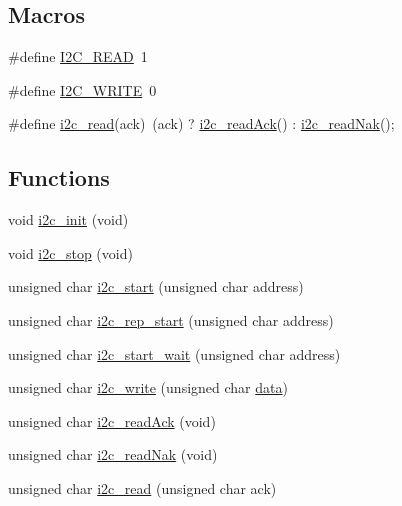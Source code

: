  \subsection*{Macros}
\begin{DoxyCompactItemize}
\item 
\#define \hyperlink{group__pfleury__ic2master_gab5c0fbe837494c5f9130a5914854250d}{I2\-C\-\_\-\-R\-E\-A\-D}~1
\item 
\#define \hyperlink{group__pfleury__ic2master_ga9536bf85bced4f4e549a82fb18eb6140}{I2\-C\-\_\-\-W\-R\-I\-T\-E}~0
\item 
\#define \hyperlink{group__pfleury__ic2master_gad33503cf741851d1bca1d274e9001796}{i2c\-\_\-read}(ack)~(ack) ? \hyperlink{group__pfleury__ic2master_ga32ac22052d55f93375b024192217db21}{i2c\-\_\-read\-Ack}() \-: \hyperlink{group__pfleury__ic2master_gad89e839fc17b05fbb5dd79897c55234e}{i2c\-\_\-read\-Nak}();
\end{DoxyCompactItemize}
\subsection*{Functions}
\begin{DoxyCompactItemize}
\item 
void \hyperlink{group__pfleury__ic2master_ga5730d9445429351b9f750084c5cb5aae}{i2c\-\_\-init} (void)
\item 
void \hyperlink{group__pfleury__ic2master_gad35d4e4f52ca74b503d5e5e1e0a3f5f3}{i2c\-\_\-stop} (void)
\item 
unsigned char \hyperlink{group__pfleury__ic2master_gaa3d328f00326115e9c660ccc838417c8}{i2c\-\_\-start} (unsigned char address)
\item 
unsigned char \hyperlink{group__pfleury__ic2master_ga70c934b61f3c6ba8524104a1d7197d30}{i2c\-\_\-rep\-\_\-start} (unsigned char address)
\item 
unsigned char \hyperlink{group__pfleury__ic2master_ga71640d1526479df4629c3024c9ada476}{i2c\-\_\-start\-\_\-wait} (unsigned char address)
\item 
unsigned char \hyperlink{group__pfleury__ic2master_gadd947aade44ed6b7f92265f9dec4a711}{i2c\-\_\-write} (unsigned char \hyperlink{CO2__serial_8c_a3825e3e0922badc8848709cf608821ea}{data})
\item 
unsigned char \hyperlink{group__pfleury__ic2master_ga32ac22052d55f93375b024192217db21}{i2c\-\_\-read\-Ack} (void)
\item 
unsigned char \hyperlink{group__pfleury__ic2master_gad89e839fc17b05fbb5dd79897c55234e}{i2c\-\_\-read\-Nak} (void)
\item 
unsigned char \hyperlink{group__pfleury__ic2master_ga669c0357614a79b3b35ae815f6f50e82}{i2c\-\_\-read} (unsigned char ack)
\end{DoxyCompactItemize}
